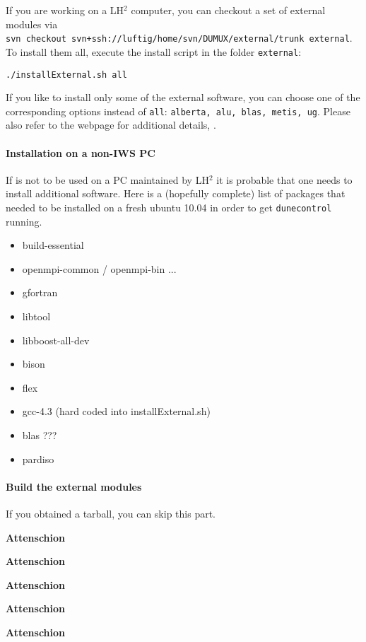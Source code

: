If you are working on a LH$^2$ computer, you can checkout a set of external modules via \\
\texttt{svn checkout svn+ssh://luftig/home/svn/DUMUX/external/trunk external}. \\
To install them all, execute the install script in the folder \texttt{external}:
\begin{center}
\texttt{./installExternal.sh all}
\end{center}
If you like to install only some of the external software, you can choose one of the 
corresponding options instead of \texttt{all}: \texttt{alberta, alu, blas, metis, ug}.
Please also refer to the \Dune webpage for additional details, \cite{DUNE-HP}. 


\paragraph{Installation on a non-IWS PC}
If \Dumux is not to be used on a PC maintained by LH$^2$ it is probable that one needs to install additional software. 
Here is a (hopefully complete) list of packages that needed to  be installed on a fresh ubuntu 10.04 in order to get \verb+dunecontrol+ running.
\begin{itemize}
  \item build-essential
  \item openmpi-common / openmpi-bin ...
  \item gfortran
  \item libtool
  \item libboost-all-dev
  \item bison
  \item flex
  \item gcc-4.3 (hard coded into installExternal.sh)
  \item blas ???
  \item pardiso
\end{itemize}


\paragraph{Build the external modules} 
If you obtained a \Dumux tarball, you can skip this part. 

\begin{turn}{45}\textbf{Attenschion}\end{turn}
\begin{turn}{45}\textbf{Attenschion}\end{turn}
\begin{turn}{45}\textbf{Attenschion}\end{turn}
\begin{turn}{45}\textbf{Attenschion}\end{turn}
\begin{turn}{45}\textbf{Attenschion}\end{turn}

